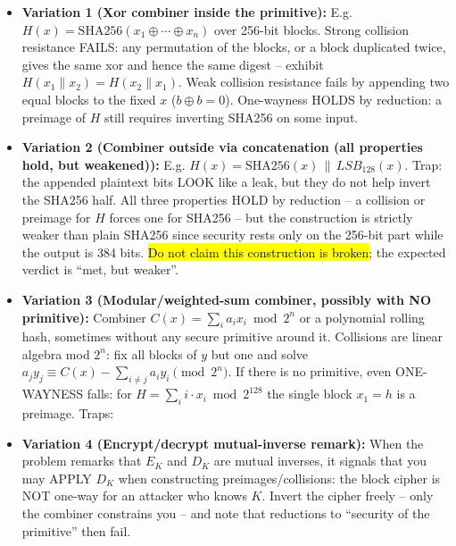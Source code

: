 \documentclass[12pt, a4paper]{article}
\newcommand{\imp}[1]{\hl{#1}}                       %
\begin{document}
\begin{trapbox}
\begin{itemize}
    \item \textbf{Variation 1 (Xor combiner inside the primitive):} E.g. $H(x) = \mathrm{SHA256}(x_1 \oplus \cdots \oplus x_n)$ over 256-bit blocks. Strong collision resistance FAILS: any permutation of the blocks, or a block duplicated twice, gives the same xor and hence the same digest -- exhibit $H(x_1 \| x_2) = H(x_2 \| x_1)$. Weak collision resistance fails by appending two equal blocks to the fixed $x$ ($b \oplus b = 0$). One-wayness HOLDS by reduction: a preimage of $H$ still requires inverting SHA256 on some input.
    \item \textbf{Variation 2 (Combiner outside via concatenation (all properties hold, but weakened)):} E.g. $H(x) = \mathrm{SHA256}(x) \,\|\, LSB_{128}(x)$. Trap: the appended plaintext bits LOOK like a leak, but they do not help invert the SHA256 half. All three properties HOLD by reduction -- a collision or preimage for $H$ forces one for SHA256 -- but the construction is strictly weaker than plain SHA256 since security rests only on the 256-bit part while the output is 384 bits. \imp{Do not claim this construction is broken}; the expected verdict is ``met, but weaker''.
    \item \textbf{Variation 3 (Modular/weighted-sum combiner, possibly with NO primitive):} Combiner $C(x) = \sum_i a_i x_i \bmod 2^n$ or a polynomial rolling hash, sometimes without any secure primitive around it. Collisions are linear algebra mod $2^n$: fix all blocks of $y$ but one and solve $a_j y_j \equiv C(x) - \sum_{i \neq j} a_i y_i \pmod{2^n}$. If there is no primitive, even ONE-WAYNESS falls: for $H = \sum_i i \cdot x_i \bmod 2^{128}$ the single block $x_1 = h$ is a preimage. Traps:
    \item \textbf{Variation 4 (Encrypt/decrypt mutual-inverse remark):} When the problem remarks that $E_K$ and $D_K$ are mutual inverses, it signals that you may APPLY $D_K$ when constructing preimages/collisions: the block cipher is NOT one-way for an attacker who knows $K$. Invert the cipher freely -- only the combiner constrains you -- and note that reductions to ``security of the primitive'' then fail.
\end{itemize}
\end{trapbox}
\end{document}
